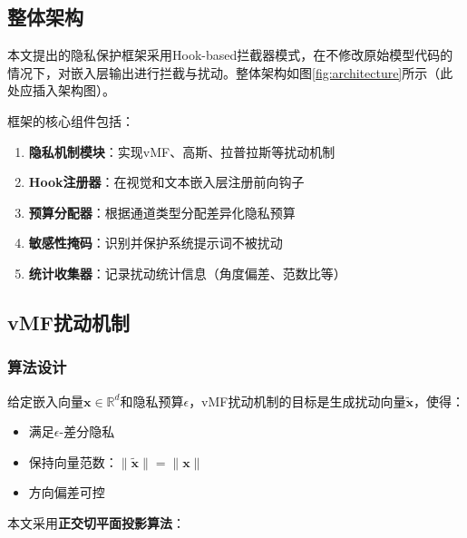 \documentclass[a4paper,12pt]{article}
\begin{document}
\subsection{整体架构}

本文提出的隐私保护框架采用Hook-based拦截器模式，在不修改原始模型代码的情况下，对嵌入层输出进行拦截与扰动。整体架构如图\ref{fig:architecture}所示（此处应插入架构图）。

框架的核心组件包括：
\begin{enumerate}
  \item \textbf{隐私机制模块}：实现vMF、高斯、拉普拉斯等扰动机制
  \item \textbf{Hook注册器}：在视觉和文本嵌入层注册前向钩子
  \item \textbf{预算分配器}：根据通道类型分配差异化隐私预算
  \item \textbf{敏感性掩码}：识别并保护系统提示词不被扰动
  \item \textbf{统计收集器}：记录扰动统计信息（角度偏差、范数比等）
\end{enumerate}

\subsection{vMF扰动机制}

\subsubsection{算法设计}

给定嵌入向量$\mathbf{x} \in \mathbb{R}^d$和隐私预算$\epsilon$，vMF扰动机制的目标是生成扰动向量$\tilde{\mathbf{x}}$，使得：
\begin{itemize}
  \item 满足$\epsilon$-差分隐私
  \item 保持向量范数：$\|\tilde{\mathbf{x}}\| = \|\mathbf{x}\|$
  \item 方向偏差可控
\end{itemize}

本文采用\textbf{正交切平面投影算法}：
\end{document}
